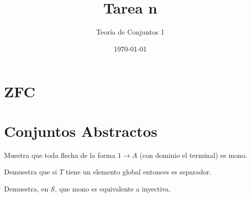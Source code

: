 \documentclass{article}
\title{Tarea n}
\author{Teoría de Conjuntos 1}
\date{\today}
\newcommand{\topos}[1]{\mathcal{#1}}
\begin{document}
\maketitle

\section{ZFC}


\section{Conjuntos Abstractos}
\begin{exercise}
    Muestra que toda flecha de la forma \(1\to A\) (con dominio el terminal) es mono.
\end{exercise}

\begin{exercise}
    Demuestra que si \(T\) tiene un elemento global entonces es separador.
\end{exercise}

\begin{exercise}
    Demuestra, en \(\topos{S}\), que mono es equivalente a inyectiva.
\end{exercise}
\end{document}
